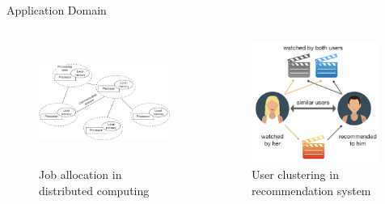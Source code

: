 \documentclass[notheorems]{beamer}
\begin{document}
\begin{frame}{Application Domain}
	\begin{columns}[T] %
		\begin{figure}
		\includegraphics[height=4cm]{distributed_computing.jpg}
		\caption*{Job allocation in distributed computing}
		\end{figure}
		\begin{figure}
		\includegraphics[height=4cm]{recommendation_system.png}
		\caption*{User clustering in recommendation system}
		\end{figure}
		\end{columns}
\end{frame}
\end{document}
